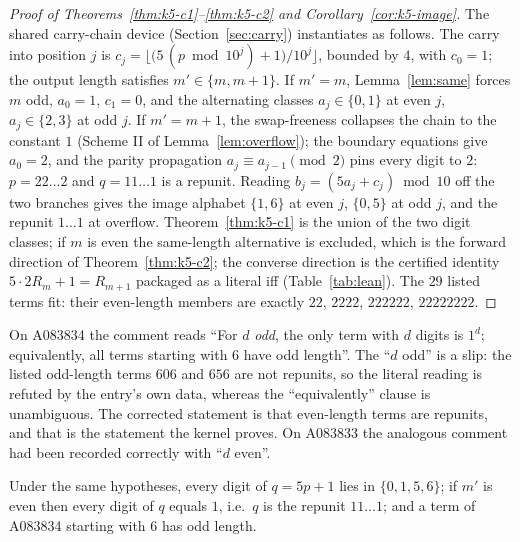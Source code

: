 \begin{proof}[Proof of
Theorems~\ref{thm:k5-c1}--\ref{thm:k5-c2} and
Corollary~\ref{cor:k5-image}]
The shared carry-chain device (Section~\ref{sec:carry})
instantiates as follows. The carry into position $j$ is
$c_j = \bigl\lfloor\bigl(5\,(p \bmod 10^j)+1\bigr)
/10^j\bigr\rfloor$, bounded by $4$, with $c_0 = 1$; the
output length satisfies $m' \in \{m, m+1\}$. If
$m' = m$, Lemma~\ref{lem:same} forces $m$ odd,
$a_0 = 1$, $c_1 = 0$, and the alternating classes
$a_j \in \{0,1\}$ at even $j$, $a_j \in \{2,3\}$ at odd
$j$. If $m' = m+1$, the swap-freeness collapses the
chain to the constant $1$ (Scheme II of
Lemma~\ref{lem:overflow}); the boundary equations give
$a_0 = 2$, and the parity propagation
$a_j \equiv a_{j-1} \pmod 2$ pins every digit to $2$:
$p = 22\ldots2$ and $q = 11\ldots1$ is a repunit.
Reading $b_j = (5a_j + c_j) \bmod 10$ off the two
branches gives the image alphabet $\{1,6\}$ at even $j$,
$\{0,5\}$ at odd $j$, and the repunit $1\ldots1$ at
overflow.
Theorem~\ref{thm:k5-c1} is the union of the two digit
classes; if $m$ is even the same-length alternative is
excluded, which is the forward direction of
Theorem~\ref{thm:k5-c2}; the converse direction is the
certified identity
$5\cdot 2R_m + 1 = R_{m+1}$ packaged as a literal iff
(Table~\ref{tab:lean}). The $29$ listed terms fit:
their even-length members are exactly $22$, $2222$,
$222222$, $22222222$.
\end{proof}

\begin{remark}
\label{rem:parity-slip}
On A083834 the comment reads ``For $d$ \emph{odd}, the
only term with $d$ digits is $1^d$; equivalently, all
terms starting with $6$ have odd length''. The ``$d$
odd'' is a slip: the listed odd-length terms $606$ and
$656$ are not repunits, so the literal reading is
refuted by the entry's own data, whereas the
``equivalently'' clause is unambiguous. The corrected
statement is that even-length terms are repunits, and
that is the statement the kernel proves. On A083833
the analogous comment had been recorded correctly with
``$d$ even''.
\end{remark}

\begin{corollary}
\label{cor:k5-image}
Under the same hypotheses, every digit of $q = 5p+1$
lies in $\{0,1,5,6\}$; if $m'$ is even then every digit
of $q$ equals $1$, i.e.\ $q$ is the repunit
$11\ldots1$; and a term of A083834 starting with $6$
has odd length.
\end{corollary}
